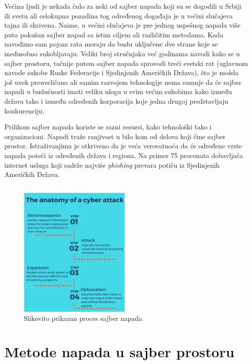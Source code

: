\documentclass[a4paper]{article}
\begin{document}
{Većina ljudi je nekada čulo za neki od sajber napada koji su se dogodili u Srbiji ili svetu ali celokupna pozadina tog određenog događaja je u većini slučajeva tajna ili skrivena. Naime, u većini slučajeva je pre jednog uspešnog napada više puta pokušan sajber napad sa istim ciljem ali različitim metodama. Kada navodimo sam pojam rata moraju da budu uključene dve strane koje se međusobno sukobljavaju. Veliki broj stručnjaka već godinama navodi kako se u sajber prostoru, tačnije putem sajber napada sprovodi treći svetski rat (uglavnom navode sukobe Ruske Federacije i Sjedinjenih Američkih Država), što je možda još uvek preuveličano ali samim razvojem tehnologije nema sumnje da će sajber napadi u budućnosti imati veliku ulogu u svim većim sukobima kako između država tako i između određenih korporacija koje jedna drugoj predstavljaju konkurenciju.

Prilikom sajber napada koriste se razni resursi, kako tehnološki tako i organizacioni. Napadi traže ranjivost u bilo kom od delova koji čine sajber prostor. Istraživanjima je otkriveno da je veća verovatnoća da će određene vrste napada poteći iz određenih država i regiona. Na primer 75 procenata dobavljača internet usluga koji sadrže najviše \emph{phishing} prevara potiču iz Sjedinjenih Američkih Država.


\begin{verbatim}
\end{verbatim}

\begin{figure}[h!]
  \centering
  \begin{center}
  \includegraphics[width=55mm]{index.jpeg}
  \end{center}
  \caption{Slikovito prikazan proces sajber napada}
  \label{fig:vr1}
\end{figure}

\newpage

\section{Metode napada u sajber prostoru}
\label{sec:naslov2}

}
\end{document}
